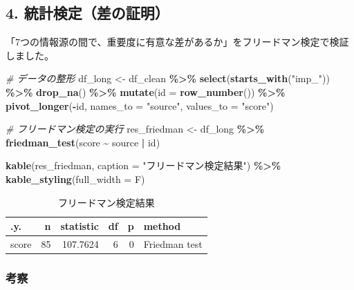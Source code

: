 \documentclass[
]{article}
\newenvironment{Shaded}{\begin{snugshade}}{\end{snugshade}}
\newcommand{\AttributeTok}[1]{\textcolor[rgb]{0.13,0.29,0.53}{#1}}
\newcommand{\CommentTok}[1]{\textcolor[rgb]{0.56,0.35,0.01}{\textit{#1}}}
\newcommand{\FunctionTok}[1]{\textcolor[rgb]{0.13,0.29,0.53}{\textbf{#1}}}
\newcommand{\NormalTok}[1]{#1}
\newcommand{\OtherTok}[1]{\textcolor[rgb]{0.56,0.35,0.01}{#1}}
\newcommand{\SpecialCharTok}[1]{\textcolor[rgb]{0.81,0.36,0.00}{\textbf{#1}}}
\newcommand{\StringTok}[1]{\textcolor[rgb]{0.31,0.60,0.02}{#1}}
\begin{document}
\subsection{4.
統計検定（差の証明）}\label{ux7d71ux8a08ux691cux5b9aux5deeux306eux8a3cux660e}

「7つの情報源の間で、重要度に有意な差があるか」をフリードマン検定で検証しました。

\begin{Shaded}
\begin{Highlighting}[]
\CommentTok{\# データの整形}
\NormalTok{df\_long }\OtherTok{\textless{}{-}}\NormalTok{ df\_clean }\SpecialCharTok{\%\textgreater{}\%}
  \FunctionTok{select}\NormalTok{(}\FunctionTok{starts\_with}\NormalTok{(}\StringTok{"imp\_"}\NormalTok{)) }\SpecialCharTok{\%\textgreater{}\%}
  \FunctionTok{drop\_na}\NormalTok{() }\SpecialCharTok{\%\textgreater{}\%}
  \FunctionTok{mutate}\NormalTok{(}\AttributeTok{id =} \FunctionTok{row\_number}\NormalTok{()) }\SpecialCharTok{\%\textgreater{}\%}
  \FunctionTok{pivot\_longer}\NormalTok{(}\SpecialCharTok{{-}}\NormalTok{id, }\AttributeTok{names\_to =} \StringTok{"source"}\NormalTok{, }\AttributeTok{values\_to =} \StringTok{"score"}\NormalTok{)}

\CommentTok{\# フリードマン検定の実行}
\NormalTok{res\_friedman }\OtherTok{\textless{}{-}}\NormalTok{ df\_long }\SpecialCharTok{\%\textgreater{}\%} \FunctionTok{friedman\_test}\NormalTok{(score }\SpecialCharTok{\textasciitilde{}}\NormalTok{ source }\SpecialCharTok{|}\NormalTok{ id)}

\FunctionTok{kable}\NormalTok{(res\_friedman, }\AttributeTok{caption =} \StringTok{"フリードマン検定結果"}\NormalTok{) }\SpecialCharTok{\%\textgreater{}\%}
  \FunctionTok{kable\_styling}\NormalTok{(}\AttributeTok{full\_width =}\NormalTok{ F)}
\end{Highlighting}
\end{Shaded}

\begin{longtable}[t]{lrrrrl}
\caption{\label{tab:friedman_test}フリードマン検定結果}\\
\toprule
.y. & n & statistic & df & p & method\\
\midrule
score & 85 & 107.7624 & 6 & 0 & Friedman test\\
\bottomrule
\end{longtable}

\subsubsection{考察}\label{ux8003ux5bdf}
\end{document}
